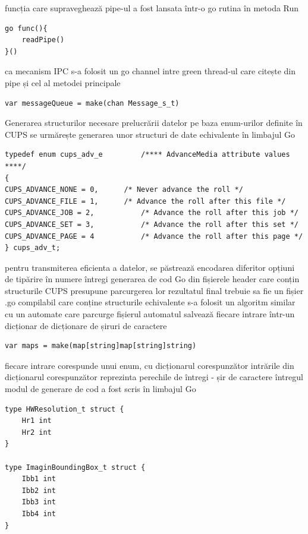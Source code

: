 \documentclass[12pt]{report}
\begin{document}
\begin{outline}
	\2 funcția care supraveghează pipe-ul a fost lansata într-o go rutina în metoda Run
\begin{lstlisting}[caption={apel readPipe in go routina separata - golang},captionpos=b]
go func(){
	readPipe()
}()
\end{lstlisting}
	\2 ca mecanism IPC s-a folosit un go channel intre green thread-ul care citește din pipe și cel al metodei principale
\begin{lstlisting}[caption={instantiere canal - golang},captionpos=b]
var messageQueue = make(chan Message_s_t)
\end{lstlisting}

\1 {\large Generarea structurilor necesare prelucrării datelor}
	\2 pe baza enum-urilor definite în CUPS se urmărește generarea unor structuri de date echivalente în limbajul Go
\begin{lstlisting}[caption={exemplu enum CUPS - C},captionpos=b]
typedef enum cups_adv_e			/**** AdvanceMedia attribute values ****/
{
CUPS_ADVANCE_NONE = 0,		/* Never advance the roll */
CUPS_ADVANCE_FILE = 1,		/* Advance the roll after this file */
CUPS_ADVANCE_JOB = 2,			/* Advance the roll after this job */
CUPS_ADVANCE_SET = 3,			/* Advance the roll after this set */
CUPS_ADVANCE_PAGE = 4			/* Advance the roll after this page */
} cups_adv_t;

\end{lstlisting}
	\2 pentru transmiterea eficienta a datelor, se păstrează encodarea diferitor opțiuni de tipărire în numere întregi
	\2 generarea de cod Go din fișierele header care conțin structurile CUPS presupune parcurgerea lor
	\2 rezultatul final trebuie sa fie un fișier .go compilabil care conține structurile echivalente
	\2 s-a folosit un algoritm similar cu un automate care parcurge fișierul
	\2 automatul salvează fiecare intrare într-un dicționar de dicționare de șiruri de caractere
\begin{lstlisting}[caption={instantiere dictionar - golang},captionpos=b]
var maps = make(map[string]map[string]string)
\end{lstlisting}
	\2 fiecare intrare corespunde unui enum, cu dicționarul corespunzător
	\2 intrările din dicționarul corespunzător reprezinta perechile de întregi - șir de caractere
	\2 întregul modul de generare de cod a fost scris în limbajul Go
\begin{lstlisting}[caption={structuri de date pentru generator/procesor date - golang},captionpos=b]
type HWResolution_t struct {
	Hr1 int
	Hr2 int
}

type ImaginBoundingBox_t struct {
	Ibb1 int
	Ibb2 int
	Ibb3 int
	Ibb4 int
}


\end{lstlisting}
\end{outline}
\end{document}
